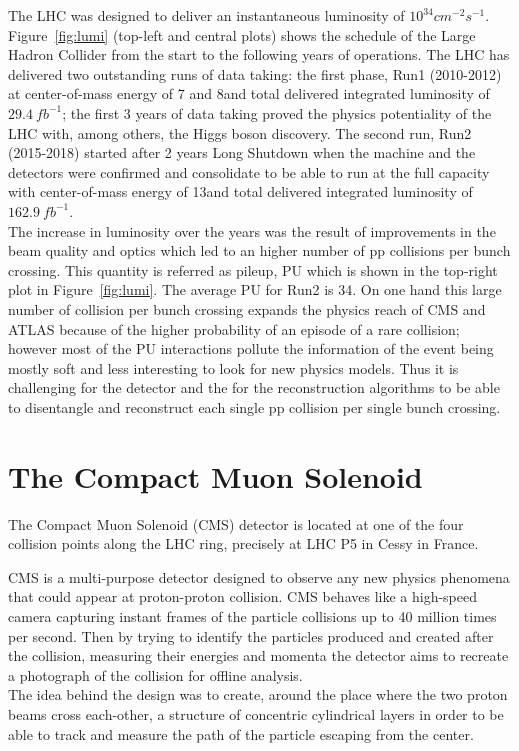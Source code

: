 The LHC was designed to deliver an instantaneous luminosity
of $10^{34}cm^{-2}s^{-1}$. Figure~\ref{fig:lumi} (top-left and central
plots) shows the schedule of the Large Hadron Collider from the start
to the following years of operations. The LHC has delivered two
outstanding runs of data taking: the first phase, Run1 (2010-2012) at
center-of-mass energy of 7 and 8\TeV and total delivered integrated
luminosity of $29.4\ fb^{-1}$; the first 3 years of data taking proved
the physics potentiality of the LHC with, among others, the Higgs boson
discovery. The second run, Run2 (2015-2018) started after 2 years Long
Shutdown when the machine and the detectors were confirmed and
consolidate to be able to run at the full capacity with 
center-of-mass energy of 13\TeV and total delivered integrated
luminosity of $162.9\ fb^{-1}$.\\
The increase in luminosity over the
years was the result of improvements in the beam quality and optics which
led to an higher number of pp collisions per bunch crossing. This
quantity is referred as pileup, PU which is shown in the top-right plot
in Figure~\ref{fig:lumi}. The average \textlangle{}PU\textrangle{} for
Run2 is 34. On one hand this large
number of collision per bunch crossing 
expands the physics reach of CMS and ATLAS because of
the higher probability of an episode of a rare collision; however
most of the PU interactions pollute the information of the
event being mostly soft and less interesting to look for
new physics models. Thus it is challenging for the detector and the for
the reconstruction algorithms to be able 
to disentangle and reconstruct each single pp collision per single
bunch crossing.

\section{The Compact Muon Solenoid}\label{cms}

The Compact Muon Solenoid (CMS) detector is located at one of the four
collision points along the LHC ring, precisely at LHC P5 in Cessy in
France.  

CMS is a multi-purpose detector designed to observe any new physics
phenomena that could appear at proton-proton collision. CMS behaves
like a high-speed camera capturing instant frames of the particle
collisions up to 40 million times per second. Then by trying to
identify the particles produced and created after the collision,
measuring their energies and momenta the detector aims to recreate a
photograph of the collision for offline analysis. \\
The idea behind the design was to create, around the place where the
two proton beams cross each-other, a structure of concentric cylindrical layers
in order to be able to track and measure the path of the particle
escaping from the center.   

